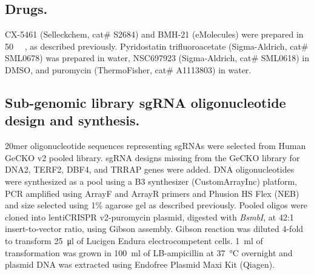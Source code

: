 \subsection{Drugs.}
CX-5461 (Selleckchem, cat\# S2684) and BMH-21 (eMolecules) were prepared in \SI{50}{\milli\Molar} , as described previously\cite{Xu2017}.  Pyridostatin trifluoroacetate (Sigma-Aldrich, cat\# SML0678) was prepared in water, NSC697923 (Sigma-Aldrich, cat\# SML0618) in DMSO, and puromycin (ThermoFisher, cat\# A1113803) in water. 

\subsection{Sub-genomic library sgRNA oligonucleotide design and synthesis.}
20mer oligonucleotide sequences representing sgRNAs were selected from Human GeCKO v2 pooled library\cite{Sanjana2014}. sgRNA designs missing from the GeCKO library for DNA2, TERF2, DBF4, and TRRAP genes were added\cite{Wang2014}. DNA oligonucleotides were synthesized as a pool using a B3 synthesizer (CustomArrayInc) platform, PCR amplified using ArrayF and ArrayR primers and Phusion HS Flex (NEB) and size selected using 1\% agarose gel as described previously\cite{Shalem2014,Sanjana2014}. Pooled oligos were cloned into lentiCRISPR v2-puromycin plasmid, digested with \textit{BsmbI}, at 42:1 insert-to-vector ratio, using Gibson assembly\cite{Shalem2014}. Gibson reaction was diluted 4-fold to transform \SI{25}{\micro\litre} of Lucigen Endura electrocompetent cells. \SI{1}{\milli\litre} of transformation was grown in \SI{100}{\milli\litre} of LB-ampicillin at \SI{37}{\celsius} overnight and plasmid DNA was extracted using Endofree Plasmid Maxi Kit (Qiagen).  

